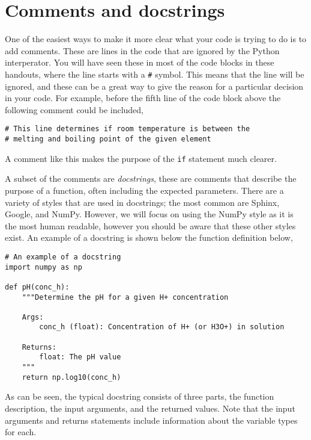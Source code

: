 \documentclass[a4paper]{article}
\begin{document}
\vspace{\baselineskip}
\begin{center}
	\noindent{}
\end{center}

\section{Comments and docstrings}
One of the easiest ways to make it more clear what your code is trying to do is to add comments.
These are lines in the code that are ignored by the Python interperator.
You will have seen these in most of the code blocks in these handouts, where the line starts with a \texttt{\#} symbol.
This means that the line will be ignored, and these can be a great way to give the reason for a particular decision in your code.
For example, before the fifth line of the code block above the following comment could be included,
\begin{lstlisting}
# This line determines if room temperature is between the
# melting and boiling point of the given element
\end{lstlisting}
A comment like this makes the purpose of the \texttt{if} statement much clearer.

A subset of the comments are \emph{docstrings}, these are comments that describe the purpose of a function, often including the expected parameters.
There are a variety of styles that are used in docstrings; the most common are Sphinx, Google, and NumPy.
However, we will focus on using the NumPy style as it is the most human readable, however you should be aware that these other styles exist.
An example of a docstring is shown below the function definition below,
\begin{lstlisting}
# An example of a docstring
import numpy as np

def pH(conc_h):
    """Determine the pH for a given H+ concentration

    Args:
        conc_h (float): Concentration of H+ (or H3O+) in solution

    Returns:
        float: The pH value
    """
    return np.log10(conc_h)
\end{lstlisting}
As can be seen, the typical docstring consists of three parts, the function description, the input arguments, and the returned values.
Note that the input arguments and returns statements include information about the variable types for each.
\end{document}
